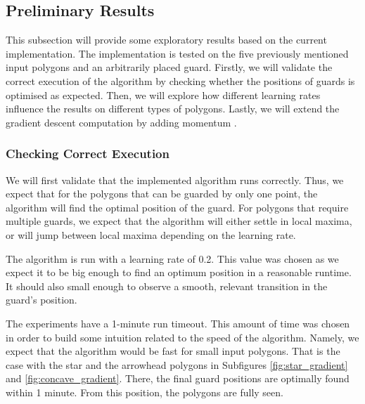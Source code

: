 \subsection{Preliminary Results}
This subsection will provide some exploratory results based on the current implementation. The implementation is tested on the five previously mentioned input polygons and an arbitrarily placed guard. Firstly, we will validate the correct execution of the algorithm by checking whether the positions of guards is optimised as expected. Then, we will explore how different learning rates influence the results on different types of polygons. Lastly, we will extend the gradient descent computation by adding momentum \cite{goodfelow2016deep}.

\subsubsection{Checking Correct Execution}
We will first validate that the implemented algorithm runs correctly. Thus, we expect that for the polygons that can be guarded by only one point, the algorithm will find the optimal position of the guard. For polygons that require multiple guards, we expect that the algorithm will either settle in local maxima, or will jump between local maxima depending on the learning rate.

The algorithm is run with a learning rate of 0.2. This value was chosen as we expect it to be big enough to find an optimum position in a reasonable runtime. It should also small enough to observe a smooth, relevant transition in the guard's position.

The experiments have a 1-minute run timeout. This amount of time was chosen in order to build some intuition related to the speed of the algorithm. Namely, we expect that the algorithm would be fast for small input polygons. That is the case with the star and the arrowhead polygons in Subfigures \ref{fig:star_gradient} and \ref{fig:concave_gradient}. There, the final guard positions are optimally found within 1 minute. From this position, the polygons are fully seen.


